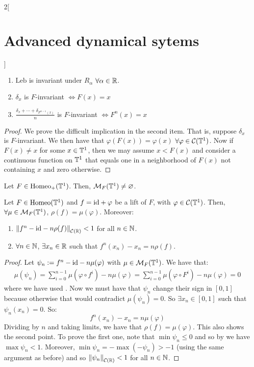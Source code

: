 \documentclass[../../../main_math.tex]{subfiles}
\begin{document}
\begin{multicols}{2}[\section{Advanced dynamical sytems}]
\begin{proposition}
    \begin{enumerate}
      \item $\text{Leb}$ is invariant under $R_\alpha$ $\forall \alpha\in\mathbb{R}$.
      \item $\delta_x$ is $F$-invariant $\iff F(x)=x$
      \item $\displaystyle\frac{\delta_x+\cdots+\delta_{F^{n-1}(x)}}{n}$ is $F$-invariant $\iff F^n(x)=x$
    \end{enumerate}
  \end{proposition}
  \begin{proof}
    We prove the difficult implication in the second item. That is, suppose $\delta_x$ is $F$-invariant. We then have that $\varphi(F(x))=\varphi(x)$ $\forall \varphi\in \mathcal{C}(\mathbb{T}^1)$. Now if $F(x)\ne x$ for some $x\in \mathbb{T}^1$, then we may assume $x < F(x)$ and consider a continuous function on $\mathbb{T}^1$ that equals one in a neighborhood of $F(x)$ not containing $x$ and zero otherwise.
  \end{proof}
  \begin{theorem}
    Let $F\in\mathrm{Homeo}_+(\mathbb{T}^1)$. Then, $\mathcal{M}_F(\mathbb{T}^1)\ne\varnothing$.
  \end{theorem}
  \begin{proposition}
    Let $F\in\mathrm{Homeo}(\mathbb{T}^1)$ and $f=\mathrm{id}+\varphi$ be a lift of $F$, with $\varphi\in\mathcal{C}(\mathbb{T}^1)$. Then, $\forall\mu\in\mathcal{M}_F(\mathbb{T}^1)$, $\rho(f)=\mu(\varphi)$. Moreover:
    \begin{enumerate}
      \item $\left\|f^n-\mathrm{id} -n\rho(f)\right\|_{\mathcal{C}(\mathbb{R})}<1$ for all $n\in\mathbb{N}$.
      \item $\forall n\in\mathbb{N}$, $\exists x_n\in\mathbb{R}$ such that $f^n(x_n)-x_n=n\rho(f)$.
    \end{enumerate}
  \end{proposition}
  \begin{proof}
    Let $\psi_n:= f^n-\mathrm{id} -n\mu(\varphi)$ with $\mu\in\mathcal{M}_F(\mathbb{T}^1)$. We have that:
    \begin{multline*}
      \mu(\psi_n)=\sum_{i=0}^{n-1}\mu(\varphi\circ f^i)-n\mu(\varphi)=\sum_{i=0}^{n-1}\mu(\varphi\circ F^i)-n\mu(\varphi)=0
    \end{multline*}
    where we have used . Now we must have that $\psi_n$ change their sign in $[0,1]$ because otherwise that would contradict $\mu(\psi_n)=0$. So $\exists x_n\in[0,1]$ such that $\psi_n(x_n)=0$. So:
    $$
      f^n(x_n)-x_n=n\mu(\varphi)
    $$
    Dividing by $n$ and taking limits, we have that $\rho(f)=\mu(\varphi)$. This also shows the second point. To prove the first one, note that $\min\psi_n\leq 0$ and so by  we have $\max\psi_n <1$. Moreover, $\min\psi_n =-\max(-\psi_n) >-1$ (using the same argument as before) and so $\left\|\psi_n\right\|_{\mathcal{C}(\mathbb{R})}<1$ for all $n\in\mathbb{N}$.
  \end{proof}

\end{multicols}
\end{document}
